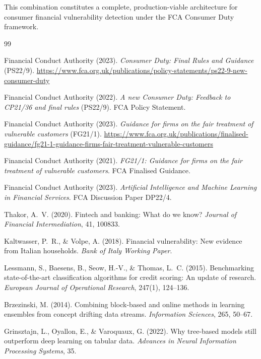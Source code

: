 \documentclass[12pt, a4paper]{article}
\begin{document}
This combination constitutes a complete, production-viable architecture for
consumer financial vulnerability detection under the FCA Consumer Duty framework.

\newpage

\begin{thebibliography}{99}

Financial Conduct Authority (2023).
\textit{Consumer Duty: Final Rules and Guidance} (PS22/9).
\url{https://www.fca.org.uk/publications/policy-statements/ps22-9-new-consumer-duty}

Financial Conduct Authority (2022).
\textit{A new Consumer Duty: Feedback to CP21/36 and final rules} (PS22/9).
FCA Policy Statement.

Financial Conduct Authority (2023).
\textit{Guidance for firms on the fair treatment of vulnerable customers} (FG21/1).
\url{https://www.fca.org.uk/publications/finalised-guidance/fg21-1-guidance-firms-fair-treatment-vulnerable-customers}

Financial Conduct Authority (2021).
\textit{FG21/1: Guidance for firms on the fair treatment of vulnerable customers}.
FCA Finalised Guidance.

Financial Conduct Authority (2023).
\textit{Artificial Intelligence and Machine Learning in Financial Services}.
FCA Discussion Paper DP22/4.

Thakor, A.~V. (2020).
Fintech and banking: What do we know?
\textit{Journal of Financial Intermediation}, 41, 100833.

Kaltwasser, P.~R., \& Volpe, A. (2018).
Financial vulnerability: New evidence from Italian households.
\textit{Bank of Italy Working Paper}.

Lessmann, S., Baesens, B., Seow, H.-V., \& Thomas, L.~C. (2015).
Benchmarking state-of-the-art classification algorithms for credit scoring:
An update of research.
\textit{European Journal of Operational Research}, 247(1), 124--136.

Brzezinski, M. (2014).
Combining block-based and online methods in learning ensembles from concept drifting data streams.
\textit{Information Sciences}, 265, 50--67.

Grinsztajn, L., Oyallon, E., \& Varoquaux, G. (2022).
Why tree-based models still outperform deep learning on tabular data.
\textit{Advances in Neural Information Processing Systems}, 35.


\end{thebibliography}
\end{document}

